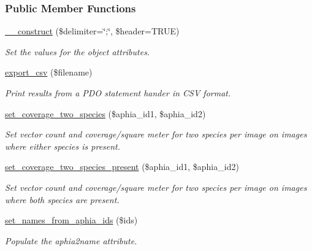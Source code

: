 \subsubsection*{Public Member Functions}
\begin{DoxyCompactItemize}
\item 
\hyperlink{classExporter_aef9e8f9d7dd29d6133b71acdc24e4ef6}{\-\_\-\-\_\-construct} (\$delimiter=\char`\"{};\char`\"{}, \$header=T\-R\-U\-E)
\begin{DoxyCompactList}\small\item\em Set the values for the object attributes. \end{DoxyCompactList}\item 
\hyperlink{classExporter_a63e4609c0612518bb77fd8b05693f92a}{export\-\_\-csv} (\$filename)
\begin{DoxyCompactList}\small\item\em Print results from a P\-D\-O statement hander in C\-S\-V format. \end{DoxyCompactList}\item 
\hyperlink{classExporter_aa2afe95206f1731839936a65a0e2cf97}{set\-\_\-coverage\-\_\-two\-\_\-species} (\$aphia\-\_\-id1, \$aphia\-\_\-id2)
\begin{DoxyCompactList}\small\item\em Set vector count and coverage/square meter for two species per image on images where either species is present. \end{DoxyCompactList}\item 
\hyperlink{classExporter_a029e2313283f605eeda5ebb46ceb4038}{set\-\_\-coverage\-\_\-two\-\_\-species\-\_\-present} (\$aphia\-\_\-id1, \$aphia\-\_\-id2)
\begin{DoxyCompactList}\small\item\em Set vector count and coverage/square meter for two species per image on images where both species are present. \end{DoxyCompactList}\item 
\hyperlink{classExporter_aef6631756a775063a2f55d7d8475c8cc}{set\-\_\-names\-\_\-from\-\_\-aphia\-\_\-ids} (\$ids)
\begin{DoxyCompactList}\small\item\em Populate the aphia2name attribute. \end{DoxyCompactList}\end{DoxyCompactItemize}
